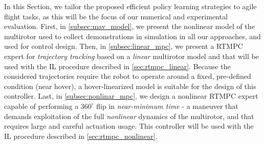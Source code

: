 In this Section, we tailor the proposed efficient policy learning strategies to agile flight tasks, as this will be the focus of our numerical and experimental evaluation. First, in \cref{subsec:mav_model}, we present the nonlinear model of the multirotor used to collect demonstrations in simulation in all our approaches, and used for control design. Then, in \cref{subsec:linear_mpc}, we present a \ac{RTMPC} expert for \textit{trajectory tracking} based on a \textit{linear} multirotor model and that will be used with the \ac{IL} procedure described in \cref{sec:rtmpc_linear}. Because the considered trajectories require the robot to operate around a fixed, pre-defined condition (near hover), a hover-linearized model is suitable for the design of this controller. Last, in \cref{subsec:nonlinar_mpc}, we design a nonlinear \ac{RTMPC} expert capable of performing a $360^\circ$ flip in \textit{near-minimum time} - a maneuver that demands exploitation of the full \textit{nonlinear} dynamics of the multirotor, and that requires large and careful actuation usage. This controller will be used with the \ac{IL} procedure described in \cref{sec:rtmpc_nonlinear}. 


